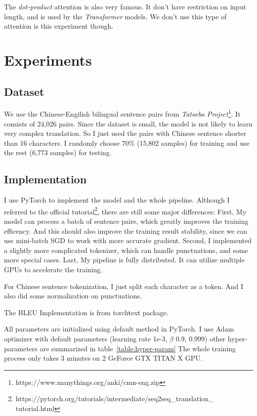 \documentclass[journal, a4paper]{IEEEtran}
\begin{document}
The \emph{dot-product} attention is also very famous. It don’t have restriction on input length, and is used by the \emph{Transformer} models. We don’t use this type of attention is this experiment though.

\section{Experiments}

\subsection{Dataset}

We use the Chinese-Engilish bilingual sentence pairs from \emph{Tatoeba Project}\footnote{https://www.manythings.org/anki/cmn-eng.zip}. It consists of 24,026 pairs. Since the dataset is small, the model is not likely to learn very complex translation. So I just used the pairs with Chinese sentence shorter than 16 characters. I randomly choose 70\% (15,802 samples) for training and use the rest (6,773 samples) for testing.

\subsection{Implementation}

I use PyTorch to implement the model and the whole pipeline. Although I referred to the official tutorial\footnote{https://pytorch.org/tutorials/intermediate/seq2seq\_translation\_\\ tutorial.html}, there are still some major differences:
First, My model can process a batch of sentence pairs, which greatly improves the training efficency. And this should also improve the training result stability, since we can use mini-batch SGD to work with more accurate gradient.
Second, I implemented a slightly more complicated tokenizer, which can handle punctuations, and some more special cases.
Last, My pipeline is fully distributed. It can utilize multiple GPUs to accelerate the training.

For Chinese sentence tokenization, I just split each character as a token. And I also did some normalization on punctuations.

The BLEU Implementation is from torchtext package.

All parameters are initialized using default method in PyTorch. I use Adam optimizer with default parameters (learning rate 1e-3, $\beta$ 0.9, 0.999) other hyper-parameters are summarized in table~\ref{table:hyper-param} The whole training process only takes 3 minutes on 2 GeForce GTX TITAN X GPU.
\end{document}
